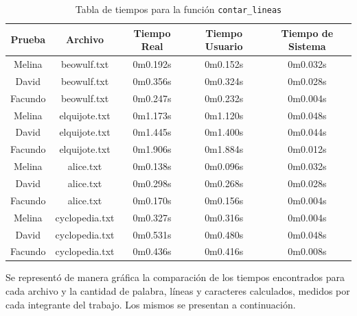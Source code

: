 \documentclass[a4paper, 10pt, twoside, notitlepage]{article}
\begin{document}
\begin{table}[H]
    \centering
    \begin{tabular}{|c|c|c|c|c|}
        \hline
         Prueba & Archivo & Tiempo Real & Tiempo Usuario & Tiempo de Sistema   \\ \hline
         Melina & beowulf.txt & 0m0.192s & 0m0.152s & 0m0.032s \\ \hline
         David & beowulf.txt & 0m0.356s & 0m0.324s & 0m0.028s \\ \hline
         Facundo & beowulf.txt & 0m0.247s & 0m0.232s & 0m0.004s \\ \hline
         Melina & elquijote.txt & 0m1.173s & 0m1.120s & 0m0.048s \\ \hline
         David & elquijote.txt & 0m1.445s & 0m1.400s & 0m0.044s \\ \hline
         Facundo & elquijote.txt & 0m1.906s & 0m1.884s & 0m0.012s \\ \hline
         Melina & alice.txt & 0m0.138s & 0m0.096s & 0m0.032s \\ \hline
         David & alice.txt & 0m0.298s & 0m0.268s & 0m0.028s \\ \hline
         Facundo & alice.txt & 0m0.170s & 0m0.156s & 0m0.004s \\ \hline
         Melina & cyclopedia.txt & 0m0.327s & 0m0.316s & 0m0.004s \\ \hline
         David & cyclopedia.txt & 0m0.531s & 0m0.480s & 0m0.048s \\ \hline
         Facundo & cyclopedia.txt & 0m0.436s & 0m0.416s & 0m0.008s \\ \hline
         
    \end{tabular}
    \caption{Tabla de tiempos para la función \texttt{contar\_lineas}}
    \label{tab:contar_lineas}
\end{table}

Se representó de manera gráfica la comparación de los tiempos encontrados para cada archivo y la cantidad de palabra, líneas y caracteres calculados, medidos por cada integrante del trabajo. Los mismos se presentan a continuación.

%
%
\end{document}
